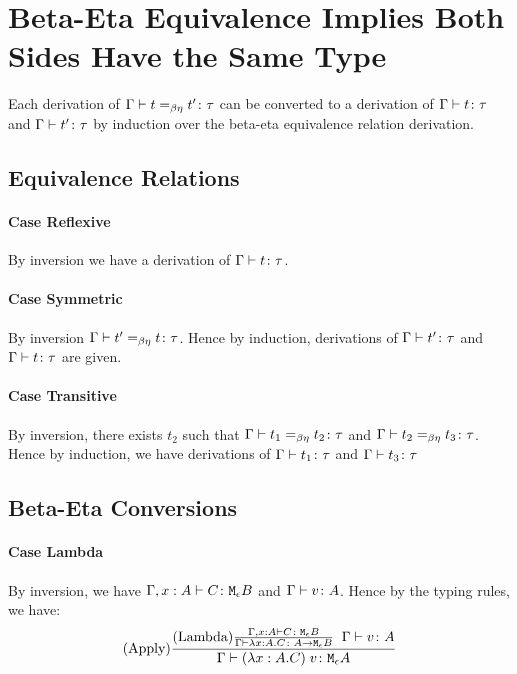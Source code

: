 {    \section{Beta-Eta Equivalence Implies Both Sides Have the Same Type}
    Each derivation of $\Gamma \vdash t =_{\beta\eta} t' \colon \tau$ can be converted to a derivation of $\Gamma \vdash t \colon \tau$ and $\Gamma \vdash t' \colon \tau$ by induction over the beta-eta equivalence relation derivation.

    \subsection{Equivalence Relations}
    \paragraph{Case Reflexive}
    By inversion we have a derivation of $\Gamma \vdash t \colon \tau$.

    \paragraph{Case Symmetric}
    By inversion $\Gamma \vdash t' =_{\beta\eta} t \colon \tau$. Hence by induction, derivations of $\Gamma \vdash t' \colon \tau$ and $\Gamma \vdash t \colon \tau$ are given.

    \paragraph{Case Transitive}
    By inversion, there exists $t_2$ such that $\Gamma \vdash t_1 =_{\beta\eta} t_2 \colon \tau$ and $\Gamma \vdash t_2 =_{\beta\eta} t_3 \colon \tau$.
    Hence by induction, we have derivations of $\Gamma \vdash t_1 \colon \tau$ and $\Gamma \vdash t_3 \colon \tau$

    \subsection{Beta-Eta Conversions}
    
    \paragraph{Case Lambda}
        By inversion, we have $\Gamma, x: A \vdash C \colon \texttt{M}_{\epsilon}{B}$ and $\Gamma \vdash v \colon A$. Hence by the typing rules, we have:
        $$(\text{Apply}) \frac{
            (\text{Lambda}) \frac{\Gamma, x: A  \vdash C \colon \texttt{M}_{\epsilon}{B}}{\Gamma \vdash \lambda x : A. C \colon A \rightarrow \texttt{M}_{\epsilon}{B}}
            \;\;
            \Gamma \vdash v \colon A
        }{\Gamma \vdash (\lambda x : A. C)\; v \colon \texttt{M}_{\epsilon}{A}}$$

}
